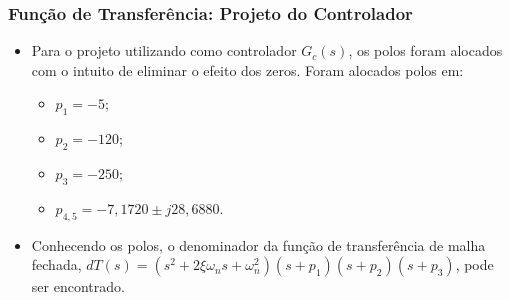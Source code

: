 \documentclass{beamer}
\begin{document}


\begin{frame}
\frametitle{Função de Transferência: Projeto do Controlador}
\begin{itemize}
\item Para o projeto utilizando como controlador $G_c(s)$, os polos foram alocados com o intuito de eliminar o efeito dos zeros. Foram alocados polos em:
\begin{itemize}
\item $p_1 = -5$;
\item $p_2 = -120$;
\item $p_3 = -250$;
\item $p_{4,5} = -7,1720 \pm j28,6880$.
\end{itemize}
\item Conhecendo os polos, o denominador da função de transferência de malha fechada, $dT(s) = (s^2+2\xi \omega_n s+ \omega_n^2)(s+p_1)(s+p_2)(s+p_3)$, pode ser encontrado.
\end{itemize}
\end{frame}


\end{document}
